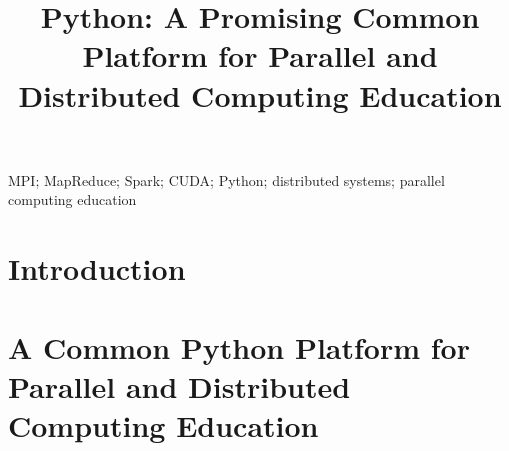 \documentclass[10pt, conference, compsocconf]{IEEEtran}
\begin{document}
\title{Python: A Promising Common Platform for Parallel and Distributed Computing Education}

\author{
\and
{}
}

\maketitle
\begin{abstract}


\end{abstract}

\begin{IEEEkeywords}MPI; MapReduce; Spark; CUDA; Python; distributed systems; parallel computing education
\end{IEEEkeywords}

\section{Introduction}


\section{A Common Python Platform for Parallel and Distributed Computing Education}
\label{sec:development}
\end{document}
